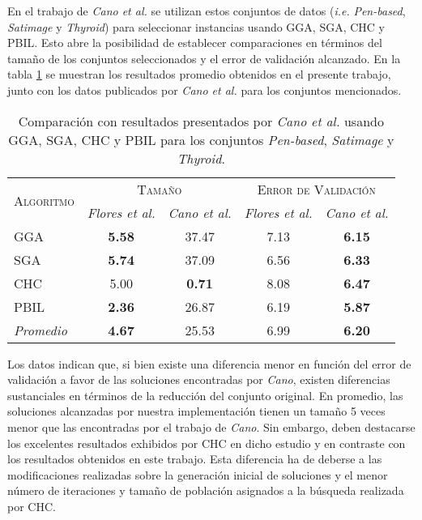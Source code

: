 En el trabajo de \emph{Cano et al.} \cite{cano2003using} se utilizan estos conjuntos de datos (\emph{i.e.} \emph{Pen-based}, \emph{Satimage} y \emph{Thyroid}) para seleccionar instancias usando GGA, SGA, CHC y PBIL. Esto abre la posibilidad de establecer comparaciones en términos del tamaño de los conjuntos seleccionados y el error de validación alcanzado. En la tabla \ref{res-big-cano} se muestran los resultados promedio obtenidos en el presente trabajo, junto con los datos publicados por \emph{Cano et al.} para los conjuntos mencionados.

\begin{table}[h!]
\centering
\begin{tabular}{l c c c c}
\hline
\multirow{2}{*}{\textsc{Algoritmo}}
	& \multicolumn{2}{c}{\textsc{\hspace*{30pt}Tamaño\hspace*{30pt}}}
	& \multicolumn{2}{c}{\textsc{Error de Validación}} \\\cline{2-5}
 & \scriptsize{\emph{Flores et al.}} & \scriptsize{\emph{Cano et al.}}
 	& \scriptsize{\emph{Flores et al.}} & \scriptsize{\emph{Cano et al.}} \\
\hline
\hline
GGA  & \textbf{5.58} & 37.47 & 7.13 & \textbf{6.15} \\
SGA  & \textbf{5.74} & 37.09 & 6.56 & \textbf{6.33} \\
CHC  & 5.00 &  \textbf{0.71} & 8.08 & \textbf{6.47} \\
PBIL & \textbf{2.36} & 26.87 & 6.19 & \textbf{5.87} \\
\hline
\emph{Promedio} & \textbf{4.67} & 25.53 & 6.99 & \textbf{6.20} \\
\hline
\end{tabular}
\caption[Comparación con resultados presentados por \emph{Cano et al.}]{Comparación con resultados presentados por \emph{Cano et al.} usando GGA, SGA, CHC y PBIL para los conjuntos \emph{Pen-based}, \emph{Satimage} y \emph{Thyroid}.}
\label{res-big-cano}
\end{table}

Los datos indican que, si bien existe una diferencia menor en función del error de validación  a favor de las soluciones encontradas por \emph{Cano}, existen diferencias sustanciales en términos de la reducción del conjunto original. En promedio, las soluciones alcanzadas por nuestra implementación tienen un tamaño 5 veces menor que las encontradas por el trabajo de \emph{Cano}. Sin embargo, deben destacarse los excelentes resultados exhibidos por CHC en dicho estudio y en contraste con los resultados obtenidos en este trabajo. Esta diferencia ha de deberse a las modificaciones realizadas sobre la generación inicial de soluciones y el menor número de iteraciones y tamaño de población asignados a la búsqueda realizada por CHC.

